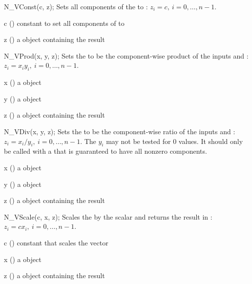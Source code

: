 {
  N\_VConst(c, z);
}
{
  Sets all components of the   to  :
  $z_i = c,\: i=0,\ldots,n-1$.
}
{
  \begin{args}[c]
  \item[c] () constant to set all components of  to
  \item[z] () a {\nvector} object containing the result
  \end{args}
}
{}
{}

{
  N\_VProd(x, y, z);
}
{
  Sets the   to be the component-wise product of the
   inputs  and : $z_i = x_i y_i,\: i=0,\ldots,n-1$.
}
{
  \begin{args}[x]
  \item[x] () a {\nvector} object
  \item[y] () a {\nvector} object
  \item[z] () a {\nvector} object containing the result
  \end{args}
}
{}
{}

{
  N\_VDiv(x, y, z);
}
{
  Sets the   to be the component-wise ratio of the
   inputs  and :
  $z_i = x_i / y_i,\: i=0,\ldots,n-1$. The $y_i$ may not be tested
  for $0$ values. It should only be called with a  that is
  guaranteed to have all nonzero components.
}
{
  \begin{args}[x]
  \item[x] () a {\nvector} object
  \item[y] () a {\nvector} object
  \item[z] () a {\nvector} object containing the result
  \end{args}
}
{}
{}

{
  N\_VScale(c, x, z);
}
{
  Scales the   by the  scalar 
  and returns the result in : $z_i = c x_i , \: i=0,\ldots,n-1$.
}
{
  \begin{args}[c]
  \item[c] () constant that scales the vector 
  \item[x] () a {\nvector} object
  \item[z] () a {\nvector} object containing the result
  \end{args}
}
{}
{}

